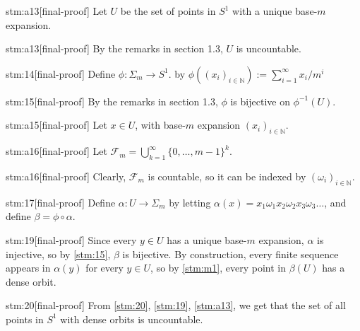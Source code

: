 \documentclass{article}
\begin{document}
\begin{stm}{stm:a13}[final-proof]
Let $U$ be the set of points in $S^1$ with a unique base-$m$ expansion. 
\end{stm}

\begin{stm}{stm:a13}[final-proof]
By the remarks in section 1.3, $U$ is uncountable.
\end{stm}

\begin{stm}{stm:14}[final-proof]
Define $\phi : \Sigma_m \to S^1$. by $\phi((x_i)_{i \in \mathbb{N}}) := \sum_{i=1}^\infty x_i / m^i$
\end{stm}

\begin{stm}{stm:15}[final-proof]
By the remarks in section 1.3, $\phi$ is bijective on $\phi^{-1}(U)$.
\end{stm}{}

\begin{stm}{stm:a15}[final-proof]
Let $x \in U$, with base-$m$ expansion $(x_i)_{i \in \mathbb{N}}$.
\end{stm}

\begin{stm}{stm:a16}[final-proof]
Let $\mathcal{F}_m = \bigcup_{k=1}^\infty \{0, \dots, m-1\}^k$.
\end{stm}

\begin{stm}{stm:a16}[final-proof]
Clearly, $\mathcal{F}_m$ is countable, so it can be indexed by $(\omega_i)_{i \in \mathbb{N}}$.
\end{stm}

\begin{stm}{stm:17}[final-proof]
Define $\alpha : U \to \Sigma_m$ by letting $\alpha(x) = x_1 \omega_1 x_2 \omega_2 x_3 \omega_3 \dots$, and define $\beta = \phi \circ \alpha$.
\end{stm}

\begin{stm}{stm:19}[final-proof]
Since every $y \in U$ has a unique base-$m$ expansion, $\alpha$ is injective, so by \ref{stm:15}, $\beta$ is bijective. By construction, every finite sequence appears in $\alpha(y)$ for every $y \in U$, so by \ref{stm:m1}, every point in $\beta(U)$ has a dense orbit.
\end{stm}

\begin{stm}{stm:20}[final-proof]
From \ref{stm:20}, \ref{stm:19}, \ref{stm:a13}, we get that the set of all points in $S^1$ with dense orbits is uncountable.
\end{stm}
\end{document}
